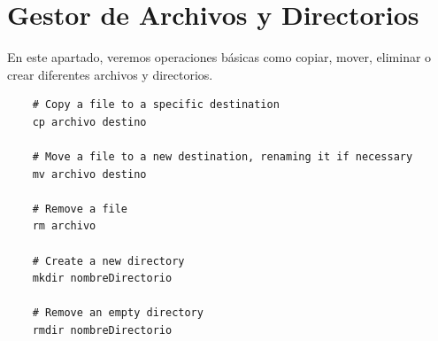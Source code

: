 \section{Gestor de Archivos y Directorios}
En este apartado, veremos operaciones básicas como copiar, mover, eliminar o crear diferentes archivos y directorios.

\begin{lstlisting}
    # Copy a file to a specific destination
    cp archivo destino

    # Move a file to a new destination, renaming it if necessary
    mv archivo destino     

    # Remove a file
    rm archivo

    # Create a new directory
    mkdir nombreDirectorio

    # Remove an empty directory
    rmdir nombreDirectorio
\end{lstlisting}
